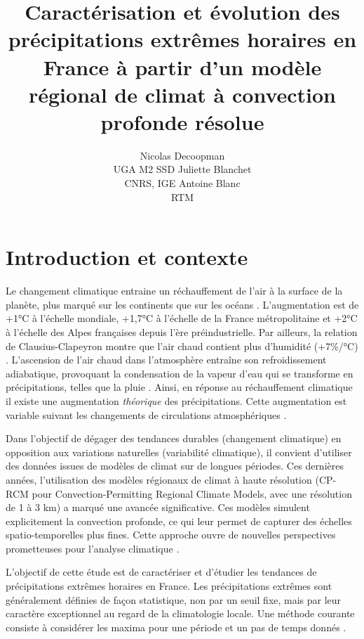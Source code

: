 \documentclass[
  article,
  nofooter,
  noheadings]{jss}
\author{Nicolas Decoopman\\UGA M2 SSD \And Juliette Blanchet\\CNRS,
IGE \And Antoine Blanc\\RTM}
\title{Caractérisation et évolution des précipitations extrêmes horaires
en France à partir d'un modèle régional de climat à convection profonde
résolue}
\begin{document}
\maketitle


\newpage

\section{Introduction et contexte}\label{introduction-et-contexte}

Le changement climatique entraine un réchauffement de l'air à la surface
de la planète, plus marqué sur les continents que sur les océans
\citep{IPCC2021}. L'augmentation est de +1°C à l'échelle mondiale,
+1,7°C à l'échelle de la France métropolitaine et +2°C à l'échelle des
Alpes françaises depuis l'ère préindustrielle. Par ailleurs, la relation
de Clausius-Clapeyron montre que l'air chaud contient plus d'humidité
(+7\%/°C) \citep{clausius1850}. L'ascension de l'air chaud dans
l'atmosphère entraîne son refroidissement adiabatique, provoquant la
condensation de la vapeur d'eau qui se transforme en précipitations,
telles que la pluie \citep{meteofrance}. Ainsi, en réponse au
réchauffement climatique il existe une augmentation \emph{théorique} des
précipitations. Cette augmentation est variable suivant les changements
de circulations atmosphériques \citep{blanchet2021explaining}.

Dans l'objectif de dégager des tendances durables (changement
climatique) en opposition aux variations naturelles (variabilité
climatique), il convient d'utiliser des données issues de modèles de
climat sur de longues périodes. Ces dernières années, l'utilisation des
modèles régionaux de climat à haute résolution (CP-RCM pour
Convection-Permitting Regional Climate Models, avec une résolution de 1
à 3 km) a marqué une avancée significative. Ces modèles simulent
explicitement la convection profonde, ce qui leur permet de capturer des
échelles spatio-temporelles plus fines. Cette approche ouvre de
nouvelles perspectives prometteuses pour l'analyse climatique
\citep{prein2015regional}.

L'objectif de cette étude est de caractériser et d'étudier les tendances
de précipitations extrêmes horaires en France. Les précipitations
extrêmes sont généralement définies de façon statistique, non par un
seuil fixe, mais par leur caractère exceptionnel au regard de la
climatologie locale. Une méthode courante consiste à considérer les
maxima pour une période et un pas de temps donnés
\citep{blanchet2022instrumental}.
\end{document}
